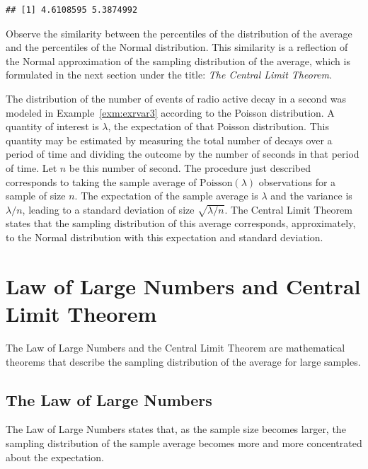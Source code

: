 \documentclass[]{krantz}
\theoremstyle{definition}
\theoremstyle{definition}
\theoremstyle{definition}
\theoremstyle{remark}
\let\BeginKnitrBlock\begin \let\EndKnitrBlock\end
\begin{document}
\begin{verbatim}
## [1] 4.6108595 5.3874992
\end{verbatim}

Observe the similarity between the percentiles of the distribution of
the average and the percentiles of the Normal distribution. This
similarity is a reflection of the Normal approximation of the sampling
distribution of the average, which is formulated in the next section
under the title: \emph{The Central Limit Theorem}.

\BeginKnitrBlock{example}
\protect\hypertarget{exm:exsampdist3}{}{\label{exm:exsampdist3} }The
distribution of the number of events of radio active decay in a second
was modeled in Example~\ref{exm:exrvar3} according to the Poisson
distribution. A quantity of interest is \(\lambda\), the expectation of
that Poisson distribution. This quantity may be estimated by measuring
the total number of decays over a period of time and dividing the
outcome by the number of seconds in that period of time. Let \(n\) be
this number of second. The procedure just described corresponds to
taking the sample average of \(\mathrm{Poisson}(\lambda)\) observations
for a sample of size \(n\). The expectation of the sample average is
\(\lambda\) and the variance is \(\lambda/n\), leading to a standard
deviation of size \(\sqrt{\lambda/n}\). The Central Limit Theorem states
that the sampling distribution of this average corresponds,
approximately, to the Normal distribution with this expectation and
standard deviation.
\EndKnitrBlock{example}

\section{Law of Large Numbers and Central Limit
Theorem}\label{law-of-large-numbers-and-central-limit-theorem}

The Law of Large Numbers and the Central Limit Theorem are mathematical
theorems that describe the sampling distribution of the average for
large samples.

\subsection{The Law of Large Numbers}\label{the-law-of-large-numbers}

The Law of Large Numbers states that, as the sample size becomes larger,
the sampling distribution of the sample average becomes more and more
concentrated about the expectation.
\end{document}
